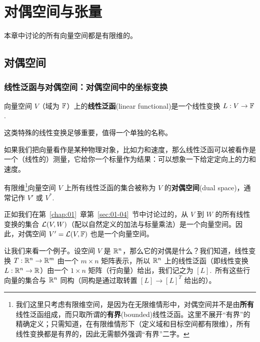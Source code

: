 


\chapter{对偶空间与张量}\label{chap:08}

本章中讨论的所有向量空间都是有限维的。

\section{对偶空间}\label{sec:08-01}

\subsection{线性泛函与对偶空间：对偶空间中的坐标变换}\label{sec:08-01-01}

\begin{definition}\label{stmt:08-01-01}
向量空间 $V$（域为 $\mathbb{F}$）上的\textbf{线性泛函}(linear functional)是一个线性变换 $L : V \to \mathbb{F}$.~
\end{definition}

这类特殊的线性变换足够重要，值得一个单独的名称。

如果我们把向量看作是某种物理对象，比如力和速度，那么线性泛函可以被看作是一个（线性的）测量，它给你一个标量作为结果：可以想象一下给定定向上的力和速度。

\begin{definition}\label{stmt:08-01-02}
有限维\footnote{
我们这里只考虑有限维空间，是因为在无限维情形中，对偶空间并不是由\textbf{所有}线性泛函组成，而只取所谓的\textbf{有界}(bounded)线性泛函。这里不展开“有界”的精确定义；只需知道，在有限维情形下（定义域和目标空间都有限维），所有线性变换都是有界的，因此无需额外强调“有界”二字。
}向量空间 $V$ 上所有线性泛函的集合被称为 $V$ 的\textbf{对偶空间}(dual space)，通常记作 $V'$ 或 $V^*$.~
\end{definition}

正如我们在第~\ref{chap:01}~章第~\ref{sec:01-04}~节中讨论过的，从 $V$ 到 $W$ 的所有线性变换的集合 $\mathcal{L}(V,W)$（配以自然定义的加法与标量乘法）是一个向量空间。因此，对偶空间 $V'=\mathcal{L}(V,\mathbb{F})$ 也是一个向量空间。

让我们来看一个例子。设空间 $V$ 是 $\mathbb{R}^n$，那么它的对偶是什么？我们知道，线性变换 $T : \mathbb{R}^n \to \mathbb{R}^m$ 由一个 $m \times n$ 矩阵表示，所以 $\mathbb{R}^n$ 上的线性泛函（即线性变换 $L : \mathbb{R}^n \to \mathbb{R}$）由一个 $1 \times n$ 矩阵（行向量）给出，我们记之为 $[L]$.~所有这些行向量的集合与 $\mathbb{R}^n$ 同构（同构是通过取转置 $[L] \to [L]^T$ 给出的）。

